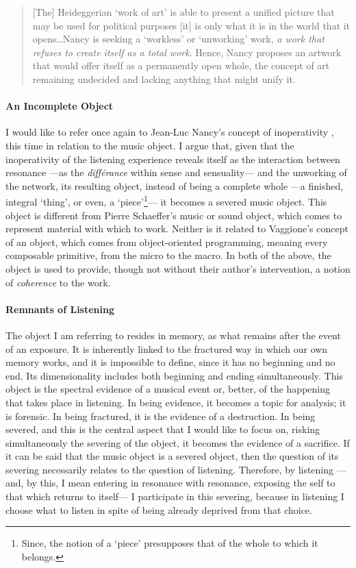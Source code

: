 \begin{quote}
	[The] Heideggerian `work of art’ is able to present a unified picture that may be used for political purposes [it] is only what it is in the world that it opens\dots Nancy is seeking a `workless’ or `unworking’ work, \textit{a work that refuses to create itself as a total work}. Hence, Nancy proposes an artwork that would offer itself as a permanently open whole, the concept of art remaining undecided and lacking anything that might unify it. \im \parencite{Gra15:The}
\end{quote}

\paragraph{An Incomplete Object}
I would like to refer once again to Jean-Luc Nancy's concept of inoperativity , this time in relation to the music object. I argue that, given that the inoperativity of the listening experience reveals itself as the interaction between resonance ---as the \textit{différance} within sense and sensuality--- and the unworking of the network, its resulting object, instead of being a complete whole ---a finished, integral `thing', or even, a `piece'\footnote{Since, the notion of a `piece' presupposes that of the whole to which it belongs.}--- it becomes a severed music object. This object is different from Pierre Schaeffer's music or sound object, which comes to represent material with which to work. Neither is it related to Vaggione's concept of an object, which comes from object-oriented programming, meaning every composable primitive, from the micro to the macro. In both of the above, the object is used to provide, though not without their author's intervention, a notion of \textit{coherence} to the work. 

\paragraph{Remnants of Listening}
The object I am referring to resides in memory, as what remains after the event of an exposure. It is inherently linked to the fractured way in which our own memory works, and it is impossible to define, since it has no beginning and no end. Its dimensionality includes both beginning and ending simultaneously. This object is the spectral evidence of a musical event or, better, of the happening that takes place in listening. In being evidence, it becomes a topic for analysis; it is forensic. In being fractured, it is the evidence of a destruction. In being severed, and this is the central aspect that I would like to focus on, risking simultaneously the severing of the object, it becomes the evidence of a sacrifice. If it can be said that the music object is a severed object, then the question of its severing necessarily relates to the question of listening. Therefore, by listening ---and, by this, I mean entering in resonance with resonance, exposing the self to that which returns to itself--- I participate in this severing, because in listening I choose what to listen in spite of being already deprived from that choice. 


